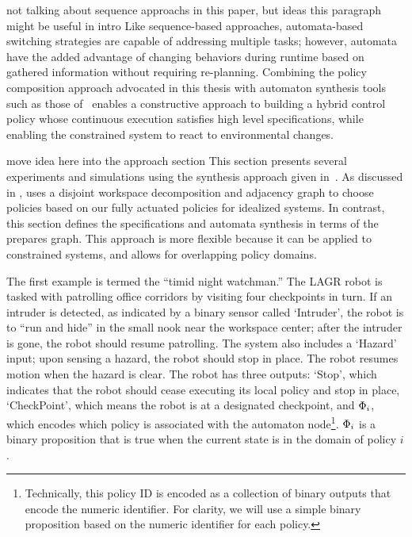 
{\large not talking about sequence approachs in this paper, but ideas
  this paragraph might be useful in intro} Like sequence-based
approaches, automata-based switching strategies are capable of
addressing multiple tasks; however, automata have the added advantage
of changing behaviors during runtime based on gathered information
without requiring re-planning.  Combining the policy composition
approach advocated in this thesis with automaton synthesis tools such
as those of~\cite{hadas_07} enables a constructive approach to
building a hybrid control policy whose continuous execution satisfies
high level specifications, while enabling the constrained system to
react to environmental changes.

{\large move idea here into the approach section }
This section presents several experiments and simulations using the synthesis
approach given in~\cite{hadas_07}.  As discussed in , \cite{hadas_07}
uses a disjoint workspace decomposition and adjacency graph to choose policies based
on our fully actuated policies for idealized systems.  In contrast, this section
defines the specifications and automata synthesis in terms of the prepares graph.
This approach is more flexible because it can be applied to constrained systems, and
allows for overlapping policy domains.


The first example is termed the ``timid night watchman.''  The LAGR robot is tasked
with patrolling office corridors by visiting four checkpoints in turn.  If an
intruder is detected, as indicated by a binary sensor called `Intruder', the robot is
to ``run and hide'' in the small nook near the workspace center; after the intruder
is gone, the robot should resume patrolling.  The system also includes a `Hazard'
input; upon sensing a hazard, the robot should stop in place.  The robot resumes
motion when the hazard is clear.  The robot has three outputs: `Stop', which
indicates that the robot should cease executing its local policy and stop in place,
`CheckPoint', which means the robot is at a designated checkpoint, and $\Phi_i$, which
encodes which policy is associated with the automaton node\footnote{Technically, this
  policy ID is encoded as a collection of binary outputs that encode the numeric
  identifier.  For clarity, we will use a simple binary proposition based on the
  numeric identifier for each policy.}.  $\Phi_i$ is a binary proposition that is true
when the current state is in the domain of policy $i$.

